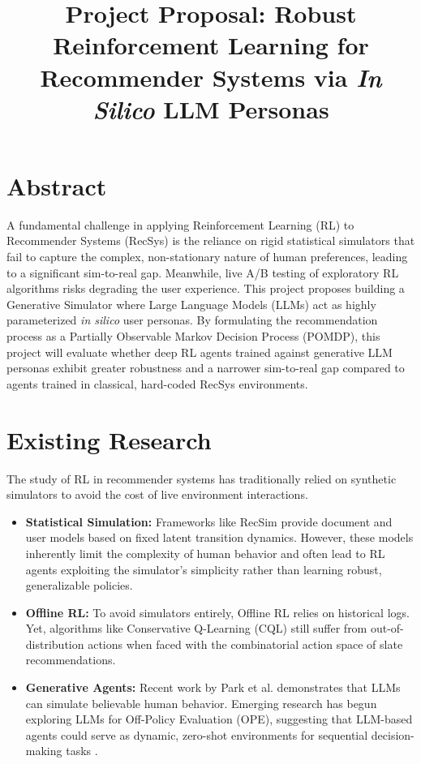 \documentclass[]{../0_aga-homework}
\title{\textbf{Project Proposal:} Robust Reinforcement Learning for Recommender Systems via \textit{In Silico} LLM Personas}
\begin{document}
\section*{Abstract}
A fundamental challenge in applying Reinforcement Learning (RL) to Recommender Systems (RecSys) is the reliance on rigid statistical simulators that fail to capture the complex, non-stationary nature of human preferences, leading to a significant sim-to-real gap. Meanwhile, live A/B testing of exploratory RL algorithms risks degrading the user experience. This project proposes building a Generative Simulator where Large Language Models (LLMs) act as highly parameterized \textit{in silico} user personas. By formulating the recommendation process as a Partially Observable Markov Decision Process (POMDP), this project will evaluate whether deep RL agents trained against generative LLM personas exhibit greater robustness and a narrower sim-to-real gap compared to agents trained in classical, hard-coded RecSys environments. 

\section*{Existing Research}
The study of RL in recommender systems has traditionally relied on synthetic simulators to avoid the cost of live environment interactions. 
\begin{itemize}
    \item \textbf{Statistical Simulation:} Frameworks like RecSim \cite{ie2019recsim} provide document and user models based on fixed latent transition dynamics. However, these models inherently limit the complexity of human behavior and often lead to RL agents exploiting the simulator's simplicity rather than learning robust, generalizable policies.
    \item \textbf{Offline RL:} To avoid simulators entirely, Offline RL \cite{levine2020offline} relies on historical logs. Yet, algorithms like Conservative Q-Learning (CQL) still suffer from out-of-distribution actions when faced with the combinatorial action space of slate recommendations.
    \item \textbf{Generative Agents:} Recent work by Park et al. \cite{park2023generative} demonstrates that LLMs can simulate believable human behavior. Emerging research has begun exploring LLMs for Off-Policy Evaluation (OPE), suggesting that LLM-based agents could serve as dynamic, zero-shot environments for sequential decision-making tasks \cite{wang2023generative}.
\end{itemize}
\end{document}
